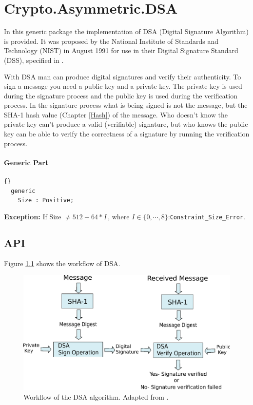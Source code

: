 \chapter{Crypto.Asymmetric.DSA}
In this generic package the implementation of DSA (Digital Signature
Algorithm) is provided. It was proposed by the National Institute of
Standards and Technology (NIST) in August 1991 for use in their
Digital Signature Standard (DSS), specified in \cite{DSA-FIPS}.

With DSA man can produce digital signatures and verify their
authenticity. To sign a message you need a public key and a private
key. The private key is used during the signature process and the
public key is used during the verification process. In the signature
process what is being signed is not the message, but the SHA-1 hash
value (Chapter \ref{Hash}) of the message. Who doesn't know the
private key can't produce a valid (verifiable) signature, but who
knows the public key can be able to verify the correctness of a
signature by running the verification process.
\subsubsection*{Generic Part}
\begin{lstlisting}{}
  generic
    Size : Positive;
\end{lstlisting}
\textbf{Exception:} If Size $\neq 512+64*I$\,, where
$I\in\{0,\cdots,8\}$:\quad \texttt{Constraint\_Size\_Error}.\\
\section{API}
Figure \ref{StructureDSA} shows the workflow of DSA.
\begin{figure}[h]
\centering
\includegraphics[scale=0.7]{./images/DSA_En_De}
\caption{Workflow of the DSA algorithm. Adapted from
  \cite{DSA-FIPS}.}\label{StructureDSA}
\end{figure}
